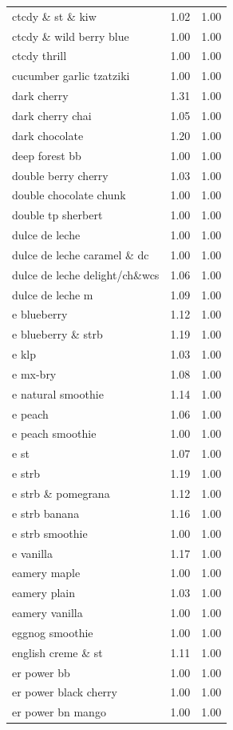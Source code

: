 \begin{table}
\begin{tabular}{lrr}
ctcdy \& st \& kiw & 1.02 & 1.00 \\
ctcdy \& wild berry blue & 1.00 & 1.00 \\
ctcdy thrill & 1.00 & 1.00 \\
cucumber garlic tzatziki & 1.00 & 1.00 \\
dark cherry & 1.31 & 1.00 \\
dark cherry chai & 1.05 & 1.00 \\
dark chocolate & 1.20 & 1.00 \\
deep forest bb & 1.00 & 1.00 \\
double berry cherry & 1.03 & 1.00 \\
double chocolate chunk & 1.00 & 1.00 \\
double tp sherbert & 1.00 & 1.00 \\
dulce de leche & 1.00 & 1.00 \\
dulce de leche caramel \& dc & 1.00 & 1.00 \\
dulce de leche delight/ch\&wcs & 1.06 & 1.00 \\
dulce de leche m & 1.09 & 1.00 \\
e blueberry & 1.12 & 1.00 \\
e blueberry \& strb & 1.19 & 1.00 \\
e klp & 1.03 & 1.00 \\
e mx-bry & 1.08 & 1.00 \\
e natural smoothie & 1.14 & 1.00 \\
e peach & 1.06 & 1.00 \\
e peach smoothie & 1.00 & 1.00 \\
e st & 1.07 & 1.00 \\
e strb & 1.19 & 1.00 \\
e strb \& pomegrana & 1.12 & 1.00 \\
e strb banana & 1.16 & 1.00 \\
e strb smoothie & 1.00 & 1.00 \\
e vanilla & 1.17 & 1.00 \\
eamery maple & 1.00 & 1.00 \\
eamery plain & 1.03 & 1.00 \\
eamery vanilla & 1.00 & 1.00 \\
eggnog smoothie & 1.00 & 1.00 \\
english creme \& st & 1.11 & 1.00 \\
er power bb & 1.00 & 1.00 \\
er power black cherry & 1.00 & 1.00 \\
er power bn mango & 1.00 & 1.00 \\

\end{tabular}
\end{table}
